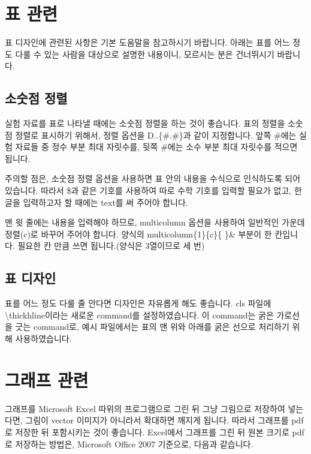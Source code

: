 \documentclass[a4paper,10pt]{article}
\begin{document}
	\section{표 관련}
	
	표 디자인에 관련된 사항은 기본 도움말을 참고하시기 바랍니다.
	아래는 표를 어느 정도 다룰 수 있는 사람을 대상으로
	설명한 내용이니, 모르시는 분은 건너뛰시기 바랍니다.
	
	\subsection{소숫점 정렬}
	실험 자료를 표로 나타낼 때에는 소숫점 정렬을 하는 것이 좋습니다.
	표의 정렬을 소숫점 정렬로 표시하기 위해서, 정렬 옵션을
	D..\{\#.\#\}과 같이 지정합니다.
	앞쪽 \#에는 실험 자료들 중 정수 부분 최대 자릿수를,
	뒷쪽 \#에는 소수 부분 최대 자릿수를 적으면 됩니다.
	
	주의할 점은, 소숫점 정렬 옵션을 사용하면 표 안의 내용을
	수식으로 인식하도록 되어 있습니다. 따라서 \$과 같은 기호를 사용하여
	따로 수학 기호를 입력할 필요가 없고, 한글을 입력하고자 할 때에는 
	text를 써 주어야 합니다.
	
	맨 윗 줄에는 내용을 입력해야 하므로, multicolumn 옵션을 사용하여
	일반적인 가운데 정렬(c)로 바꾸어 주어야 합니다.
	양식의 multicolumn\{1\}\{c\}\{ \}\& 부분이 한 칸입니다.
	필요한 칸 만큼 쓰면 됩니다.(양식은 3열이므로 세 번)
	
	\subsection{표 디자인}
	표를 어느 정도 다룰 줄 안다면 디자인은 자유롭게 해도 좋습니다.
	cls 파일에 \textbackslash thickhline이라는
	새로운 command를 설정하였습니다.
	이 command는 굵은 가로선을 긋는 command로,
	예시 파일에서는 표의 맨 위와 아래를 굵은 선으로
	처리하기 위해 사용하였습니다.
	
	\section{그래프 관련}
	그래프를 Microsoft Excel 따위의 프로그램으로 그린 뒤
	그냥 그림으로 저장하여 넣는다면, 그림이 vector 이미지가 아니라서
	확대하면 깨지게 됩니다.
	따라서 그래프를 pdf로 저장한 뒤 포함시키는 것이 좋습니다.
	Excel에서 그래프를 그린 뒤 원본 크기로 pdf로 저장하는 방법은, 
	Microsoft Office 2007 기준으로, 다음과 같습니다.
	
\end{document}
